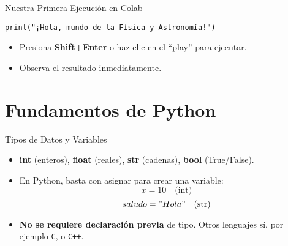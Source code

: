 \documentclass[10pt]{beamer}
\begin{document}
\begin{frame}[fragile]{Nuestra Primera Ejecución en Colab}
\begin{verbatim}
print("¡Hola, mundo de la Física y Astronomía!")
\end{verbatim}
\begin{itemize}
  \item Presiona \textbf{Shift+Enter} o haz clic en el “play” para ejecutar.
  \item Observa el resultado inmediatamente.
\end{itemize}
\end{frame}

\section{Fundamentos de Python}

\begin{frame}{Tipos de Datos y Variables}
  \begin{itemize}
    \item \textbf{int} (enteros), \textbf{float} (reales), \textbf{str} (cadenas), \textbf{bool} (True/False).
    \item En Python, basta con asignar para crear una variable:
          \[
            x = 10 \quad \text{(int)}
          \]
          \[
            saludo = "Hola" \quad \text{(str)}
          \]
    \item \textbf{No se requiere declaración previa} de tipo. Otros lenguajes sí, por ejemplo \texttt{C}, o \texttt{C++}.
  \end{itemize}
\end{frame}
\end{document}

